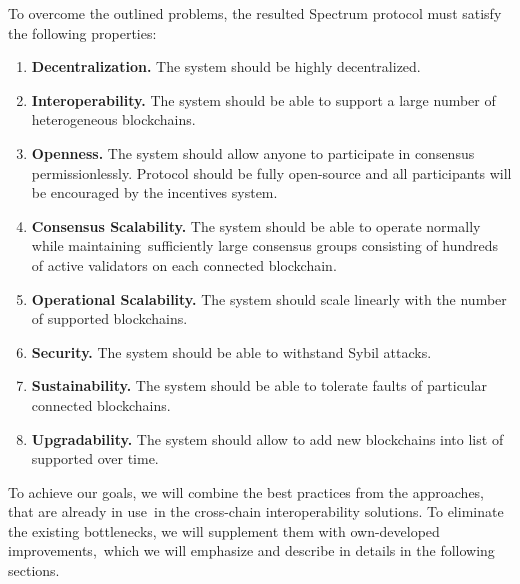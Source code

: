 To overcome the outlined problems, the resulted Spectrum protocol must satisfy the following properties:

\begin{enumerate}
    \item \textbf{Decentralization.} The system should be highly decentralized.
    \item \textbf{Interoperability.} The system should be able to support a large number of heterogeneous blockchains.
    \item \textbf{Openness.} The system should allow anyone to participate in consensus permissionlessly.
    Protocol should be fully open-source and all participants will be encouraged by the incentives system.
    \item \textbf{Consensus Scalability.} The system should be able to operate normally while maintaining\
    sufficiently large consensus groups consisting of hundreds of active validators on each connected blockchain.
    \item \textbf{Operational Scalability.} The system should scale linearly with the number of supported blockchains.
    \item \textbf{Security.} The system should be able to withstand Sybil attacks.
    \item \textbf{Sustainability.} The system should be able to tolerate faults of particular connected blockchains.
    \item \textbf{Upgradability.} The system should allow to add new blockchains into list of supported over time.
\end{enumerate}

To achieve our goals, we will combine the best practices from the approaches, that are already in use\
in the cross-chain interoperability solutions.
To eliminate the existing bottlenecks, we will supplement them with own-developed improvements,\
which we will emphasize and describe in details in the following sections.